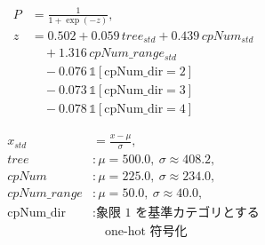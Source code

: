 \begin{equation}
\label{eq:logistic_single_scaled}
\begin{aligned}
  P &= \frac{1}{1 + \exp(-z)}, \\
  z &= 0.502 + 0.059\, tree_{std} + 0.439\, cpNum_{std} \\
    &\quad + 1.316\, cpNum\_range_{std} \\
    &\quad - 0.076\, \mathbb{1}[\mathrm{cpNum\_dir}{=}2] \\
    &\quad - 0.073\, \mathbb{1}[\mathrm{cpNum\_dir}{=}3] \\
    &\quad - 0.078\, \mathbb{1}[\mathrm{cpNum\_dir}{=}4]
\end{aligned}
\end{equation}

\begin{equation}
\label{eq:standardization_1}
\begin{aligned}
  x_{std} &= \frac{x - \mu}{\sigma}, \\
  tree &: \mu=500.0,\ \sigma \approx 408.2, \\
  cpNum &: \mu=225.0,\ \sigma \approx 234.0, \\
  cpNum\_range &: \mu=50.0,\ \sigma \approx 40.0, \\
  \mathrm{cpNum\_dir} &: \text{象限 1 を基準カテゴリとする} \\
    &\quad \text{one-hot 符号化}
\end{aligned}
\end{equation}
